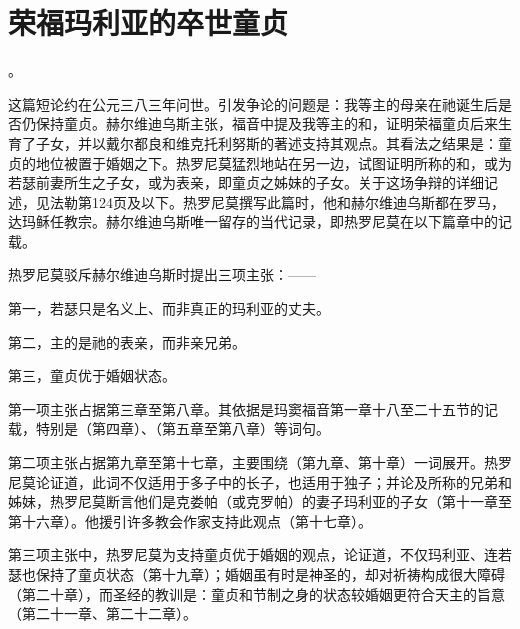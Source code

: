 
\chapter{荣福玛利亚的卒世童贞}


。\par

这篇短论约在公元三八三年问世。引发争论的问题是：我等主的母亲在祂诞生后是否仍保持童贞。赫尔维迪乌斯主张，福音中提及我等主的和，证明荣福童贞后来生育了子女，并以戴尔都良和维克托利努斯的著述支持其观点。其看法之结果是：童贞的地位被置于婚姻之下。热罗尼莫猛烈地站在另一边，试图证明所称的和，或为若瑟前妻所生之子女，或为表亲，即童贞之姊妹的子女。关于这场争辩的详细记述，见法勒第124页及以下。热罗尼莫撰写此篇时，他和赫尔维迪乌斯都在罗马，达玛稣任教宗。赫尔维迪乌斯唯一留存的当代记录，即热罗尼莫在以下篇章中的记载。\par

热罗尼莫驳斥赫尔维迪乌斯时提出三项主张：——\par

第一，若瑟只是名义上、而非真正的玛利亚的丈夫。\par

第二，主的是祂的表亲，而非亲兄弟。\par

第三，童贞优于婚姻状态。\par

第一项主张占据第三章至第八章。其依据是玛窦福音第一章十八至二十五节的记载，特别是（第四章）、（第五章至第八章）等词句。\par

第二项主张占据第九章至第十七章，主要围绕（第九章、第十章）一词展开。热罗尼莫论证道，此词不仅适用于多子中的长子，也适用于独子；并论及所称的兄弟和姊妹，热罗尼莫断言他们是克娄帕（或克罗帕）的妻子玛利亚的子女（第十一章至第十六章）。他援引许多教会作家支持此观点（第十七章）。\par

第三项主张中，热罗尼莫为支持童贞优于婚姻的观点，论证道，不仅玛利亚、连若瑟也保持了童贞状态（第十九章）；婚姻虽有时是神圣的，却对祈祷构成很大障碍（第二十章），而圣经的教训是：童贞和节制之身的状态较婚姻更符合天主的旨意（第二十一章、第二十二章）。\par

